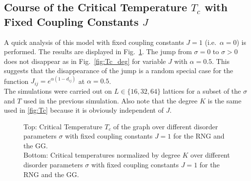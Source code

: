 \subsection{Course of the Critical Temperature $T_c$ with Fixed Coupling Constants $J$}
\label{appendix:fixedCoupling}
    A quick analysis of this model with fixed coupling constants \(J = 1\)
    (i.e.\ \(\alpha=0\)) is performed. The results are displayed in Fig.\ \ref{fig:Tc_deg_A0}.
    The jump from \(\sigma=0\) to \(\sigma>0\) does not disappear as in Fig.\ \ref{fig:Tc_deg}
    for variable \(J\) with \(\alpha=0.5\). This suggests that the
    disappearance of the jump is a random special case for the function
    \(J_{ij}=e^{\alpha(1-d_{ij})}\) at \(\alpha=0.5\).\\
    The simulations were carried out on \(L \in \{16,32,64\}\) lattices
    for a subset of the \(\sigma\) and \(T\) used in the previous simulation.
    Also note that the degree \(K\) is
    the same used in \ref{fig:Tc}
    because it is obviously independent of \(J\).
    \begin{figure}[htbp]
        \centering


        \caption[Critical Temperature and Critical Temperature Normalized by Degree of the Graph for Fixed Coupling Constants $J=1$]
        {
            Top: Critical Temperature \(T_c\) of the graph over different
            disorder parameters \(\sigma\) with fixed coupling constants \(J=1\) for
             the RNG and
             the GG.\\
            Bottom: Critical temperatures normalized by degree \(K\) over
            different disorder parameters \(\sigma\) with fixed coupling constants \(J=1\) for
             the RNG and
             the GG.
        }
        \label{fig:Tc_deg_A0}
    \end{figure}\\
